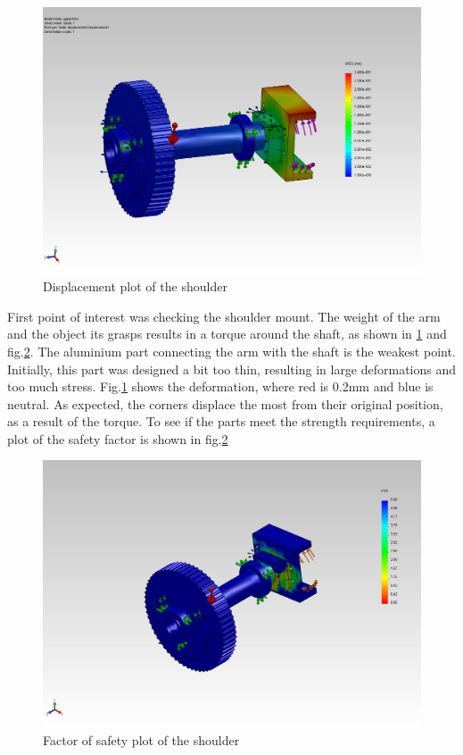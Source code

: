 \documentclass[technical_document.tex]{subfiles}
\begin{document}
\begin{figure}[ht!]
	\centering
	\mbox{\includegraphics[scale=0.4]{Images/upperArm_displace.jpg}}
	\caption{Displacement plot of the shoulder}
	\label{fig:shoulder_displace}
\end{figure}

First point of interest was checking the shoulder mount. The weight of the arm and the object its grasps results in a torque around the shaft, as shown in \ref{fig:shoulder_displace} and fig.\ref{fig:shoulder_FOS}. The aluminium part connecting the arm with the shaft is the weakest point. Initially, this part was designed a bit too thin, resulting in large deformations and too much stress. Fig.\ref{fig:shoulder_displace} shows the deformation, where red is 0.2mm and blue is neutral. As expected, the corners displace the most from their original position, as a result of the torque. To see if the parts meet the strength requirements, a plot of the safety factor is shown in fig.\ref{fig:shoulder_FOS}

\begin{figure}[ht!]
	\centering
	\mbox{\includegraphics[scale=0.4]{Images/upperArm_FOS.jpg}}
	\caption{Factor of safety plot of the shoulder}
	\label{fig:shoulder_FOS}
\end{figure}
\end{document}

